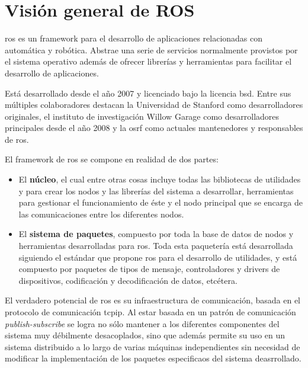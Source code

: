 \chapter{Visión general de ROS}
\label{ch:ros-overview}

\Acrfull{ros} es un \ac{framework} para el desarrollo de aplicaciones relacionadas con automática y robótica. Abstrae una serie de servicios normalmente provistos por el sistema operativo además de ofrecer librerías y herramientas para facilitar el desarrollo de aplicaciones.

Está desarrollado desde el año 2007 y licenciado bajo la licencia \ac{bsd}. Entre sus múltiples colaboradores destacan la Universidad de Stanford como desarrolladores originales, el instituto de investigación Willow Garage como desarrolladores principales desde el año 2008 y la \ac{osrf} como actuales mantenedores y responsables de \ac{ros}. 

El \gls{framework} de \acrshort{ros} se compone en realidad de dos partes:

\begin{itemize}
	\item El \textbf{núcleo}, el cual entre otras cosas incluye todas las bibliotecas de utilidades y  para crear los nodos y las librerías del sistema a desarrollar, herramientas para gestionar el funcionamiento de éste y el nodo principal que se encarga de las comunicaciones entre los diferentes nodos.
	\item El \textbf{sistema de paquetes}, compuesto por toda la base de datos de nodos y herramientas desarrolladas para \ac{ros}. Toda esta paquetería está desarrollada siguiendo el estándar que propone \ac{ros} para el desarrollo de utilidades, y está compuesto por paquetes de tipos de mensaje, controladores y drivers de dispositivos, codificación y decodificación de datos, etcétera.
\end{itemize}

El verdadero potencial de \ac{ros} es su infraestructura de comunicación, basada en el protocolo de comunicación \ac{tcpip}. Al estar basada en un patrón de comunicación \textit{publish-subscribe} se logra no sólo mantener a los diferentes componentes del sistema muy débilmente desacoplados, sino que además permite su uso en un sistema distribuido a lo largo de varias máquinas independientes sin necesidad de modificar la implementación de los paquetes especificaos del sistema deasrrollado.

